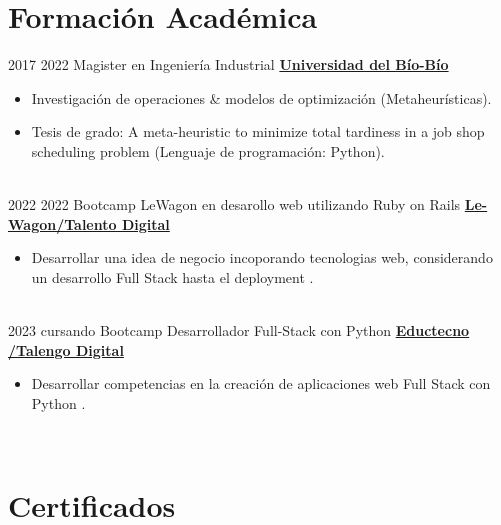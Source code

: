 \documentclass[letterpaper]{DS_class_file} %
\begin{document}
\makeprofile %

\section{Formación Académica}

\begin{twenty} %
   	\twentyitem
	    {2017}
		{2022}
	    {\hspace{0.2cm}Magister en Ingeniería Industrial}
	    {\href{https://magister.industrial.ubiobio.cl/}{\hspace{0.27cm} \textbf{Universidad del Bío-Bío} }}
	    {}
	    {\begin{itemize}
			\item Investigación de operaciones \& modelos de optimización (Metaheurísticas).
			\item Tesis de grado: A meta-heuristic to minimize total tardiness in a job shop scheduling problem (Lenguaje de programación: Python).
		\end{itemize}}
		\\
	   	\twentyitem
			{2022}
			{2022}
			{\hspace{0.2cm}Bootcamp LeWagon en desarollo web utilizando Ruby on Rails}
			{\href{https://www.lewagon.com}{\hspace{0.27cm} \textbf{Le-Wagon/Talento Digital} }}
			{}
			{\begin{itemize}
					\item Desarrollar una idea de negocio incoporando tecnologias web,  considerando un desarrollo Full Stack  hasta el deployment .
			\end{itemize}}
		\\
		\twentyitem
		{2023}
		{cursando}
		{\hspace{0.2cm}Bootcamp Desarrollador Full-Stack con Python}
		{\href{https://edutecno.cl/}{\hspace{0.27cm} \textbf{Eductecno /Talengo Digital} }}
		{}
		{\begin{itemize}
				\item Desarrollar competencias en la creación de aplicaciones web Full Stack con Python .
		\end{itemize}}
			\\
\end{twenty}


\section{Certificados}
\end{document}
